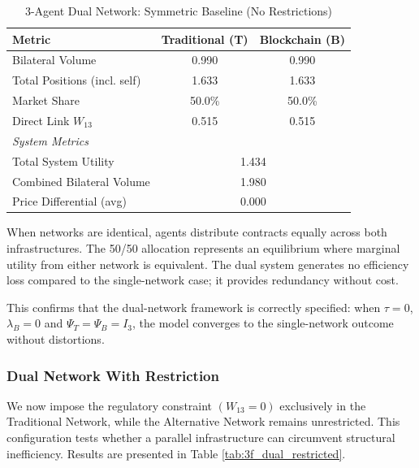 \begin{table}[h]
\centering
\caption{3-Agent Dual Network: Symmetric Baseline (No Restrictions)}
\label{tab:3f_dual_baseline}
\begin{tabular}{lcc}
\hline
\textbf{Metric} & \textbf{Traditional (T)} & \textbf{Blockchain (B)} \\ \hline
Bilateral Volume & 0.990 & 0.990 \\
Total Positions (incl. self) & 1.633 & 1.633 \\
Market Share & 50.0\% & 50.0\% \\
Direct Link $W_{13}$ & 0.515 & 0.515 \\
\hline
\multicolumn{3}{l}{\textit{System Metrics}} \\
Total System Utility & \multicolumn{2}{c}{1.434} \\
Combined Bilateral Volume & \multicolumn{2}{c}{1.980} \\
Price Differential (avg) & \multicolumn{2}{c}{0.000} \\
\hline
\end{tabular}
\end{table}

When networks are identical, agents distribute contracts equally across both infrastructures. The 50/50 allocation represents an equilibrium where marginal utility from either network is equivalent. The dual system generates no efficiency loss compared to the single-network case; it provides redundancy without cost.

This confirms that the dual-network framework is correctly specified: when $\tau=0$, $\lambda_B=0$ and $\Psi_T=\Psi_B=I_3$, the model converges to the single-network outcome without distortions.

\subsubsection{Dual Network With Restriction}

We now impose the regulatory constraint $(W_{13}=0)$ exclusively in the Traditional Network, while the Alternative Network remains unrestricted. This configuration tests whether a parallel infrastructure can circumvent structural inefficiency. Results are presented in Table \ref{tab:3f_dual_restricted}.

